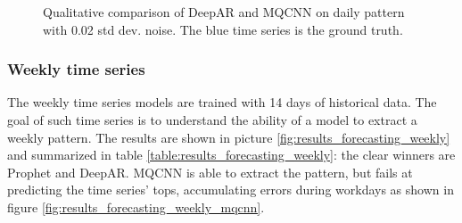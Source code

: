 \documentclass[a4paper, 12pt]{article} %
\begin{document}
	\begin{figure}\centering
		 \hfill
		
		\caption{Qualitative comparison of DeepAR and MQCNN on daily pattern with 0.02 std dev. noise. The blue time series is the ground truth.}
		\label{fig:results_forecasting_daily_02_mqcnn_deepar}
	\end{figure}
	
	\clearpage
	\subsubsection{Weekly time series} \label{sssec:results_forecasting_weekly}
	The weekly time series models are trained with 14 days of historical data. The goal of such time series is to understand the ability of a model to extract a weekly pattern.
	 The results are shown in picture \ref{fig:results_forecasting_weekly} and summarized in table \ref{table:results_forecasting_weekly}: the clear winners are Prophet and DeepAR. MQCNN is able to extract the pattern, but fails at predicting the time series' tops, accumulating errors during workdays as shown in figure \ref{fig:results_forecasting_weekly_mqcnn}.
	
\end{document}
